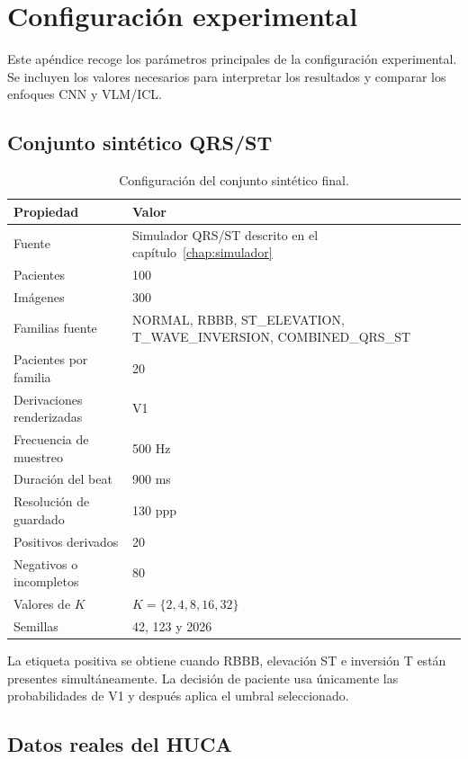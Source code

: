 \chapter{Configuración experimental}
\label{app:configuracion}

Este apéndice recoge los parámetros principales de la configuración experimental. Se incluyen los valores necesarios para interpretar los resultados y comparar los enfoques CNN y VLM/ICL.

\section{Conjunto sintético QRS/ST}

\begin{table}[H]
  \centering
  \small
  \begin{tabularx}{0.94\textwidth}{p{4.4cm}X}
    \toprule
    Propiedad & Valor \\
    \midrule
    Fuente & Simulador QRS/ST descrito en el capítulo~\ref{chap:simulador} \\
    Pacientes & 100 \\
    Imágenes & 300 \\
    Familias fuente & NORMAL, RBBB, ST\_ELEVATION, T\_WAVE\_INVERSION, COMBINED\_QRS\_ST \\
    Pacientes por familia & 20 \\
    Derivaciones renderizadas & V1 \\
    Frecuencia de muestreo & 500 Hz \\
    Duración del beat & 900 ms \\
    Resolución de guardado & 130 ppp \\
    Positivos derivados & 20 \\
    Negativos o incompletos & 80 \\
    Valores de \(K\) & \(K=\{2,4,8,16,32\}\) \\
    Semillas & 42, 123 y 2026 \\
    \bottomrule
  \end{tabularx}
  \caption{Configuración del conjunto sintético final.}
  \label{tab:config_sintetico_final}
\end{table}

La etiqueta positiva se obtiene cuando RBBB, elevación ST e inversión T están presentes simultáneamente. La decisión de paciente usa únicamente las probabilidades de V1 y después aplica el umbral seleccionado.

\section{Datos reales del HUCA}

